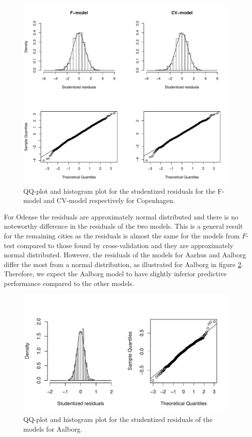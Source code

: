 \begin{figure}[H]
    \centering
  \includegraphics[width = 0.9 \textwidth]{figures/Nanna/studentized_res_plot.pdf}
  \caption{QQ-plot and histogram plot for the studentized residuals for the F-model and CV-model respectively for Copenhagen.}
  \label{fig:studentized_res_plot}
\end{figure}
\newpage
For Odense the residuals are approximately normal distributed and there is no noteworthy difference in the residuals of the two models.
This is a general result for the remaining cities as the residuals is almost the same for the models from $F$-test compared to those found by cross-validation and they are approximately normal distributed.
However, the residuals of the models for Aarhus and Aalborg differ the most from a normal distribution, as illustrated for Aalborg in figure \ref{fig:studentized_res_plot_Aalborg}.
Therefore, we expect the Aalborg model to have slightly inferior predictive performance compared to the other models.
\begin{figure}[H]
    \centering
  \includegraphics[width = 0.9 \textwidth]{figures/Nanna/NormalAal.pdf}
  \caption{QQ-plot and histogram plot for the studentized residuals of the models for Aalborg.}
  \label{fig:studentized_res_plot_Aalborg}
\end{figure}

